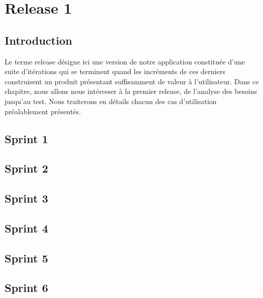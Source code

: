 \chapter{Release 1}
\section{Introduction}

Le terme release d\'{e}signe ici une version de notre application constitu\'{e}e d'une suite d'it\'{e}rations
qui se terminent quand les incr\'{e}ments de ces derniers construisent un produit pr\'{e}sentant
suffisamment de valeur \`{a} l'utilisateur.
Dans ce chapitre, nous allons nous int\'{e}resser \`{a} la premier release, de l'analyse des besoins
jusqu'au test. Nous traiterons en d\'{e}tails chacun des cas d'utilisation pr\'{e}alablement pr\'{e}sent\'{e}s.

\section{ Sprint 1 }


\section{ Sprint 2 }


\section{ Sprint 3 }


\section{ Sprint 4 }


\section{ Sprint 5 }


\section{ Sprint 6 }

